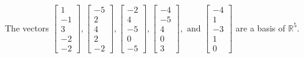 \begin{exercise}
\begin{exerciseStatement}
  \end{exerciseStatement}
  \begin{exerciseAnswer}
   The vectors \(\left[\begin{array}{r}
1 \\
-1 \\
3 \\
-2 \\
-2
\end{array}\right] , \left[\begin{array}{r}
-5 \\
2 \\
4 \\
2 \\
-2
\end{array}\right] , \left[\begin{array}{r}
-2 \\
4 \\
-5 \\
0 \\
-5
\end{array}\right] , \left[\begin{array}{r}
-4 \\
-5 \\
4 \\
0 \\
3
\end{array}\right] , \text{ and } \left[\begin{array}{r}
-4 \\
1 \\
-3 \\
1 \\
0
\end{array}\right]\) 
  	 are  a basis of \(\mathbb{R}^5\).
  


  \end{exerciseAnswer}
\end{exercise}